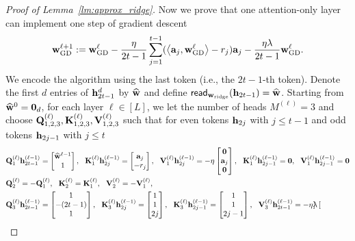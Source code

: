 \begin{proof}[Proof of Lemma~\ref{lm:approx_ridge}]
Now we prove that one  attention-only layer can implement one step of gradient descent
\begin{align*}
    {\mathbf w}^{{{\ell}}+1}_{{\mathrm{GD}}}:={\mathbf w}^{{{\ell}}}_{{\mathrm{GD}}}- \frac{\eta}{2t-1}\sum_{j=1}^{t-1}(\left\langle{\mathbf a}_j,{\mathbf w}^{{\ell}}_{{\mathrm{GD}}}\right\rangle-r_j){\mathbf a}_j- \frac{\eta\lambda}{2t-1}{\mathbf w}^{{\ell}}_{{\mathrm{GD}}}.
\end{align*}
We encode the algorithm using the last token (i.e., the $2t-1$-th token).
Denote the first $d$ entries of ${\mathbf h}_{2t-1}^{{d}}$ by $\widehat{{\mathbf w}}$ and  define ${\sf read}_{{\mathbf w}_{{\rm ridge}}}({\mathbf h}_{2t-1})=\widehat{{\mathbf w}}$. Starting from $\widehat{{\mathbf w}}^{0}={\mathbf 0}_d$, for each layer $\ell\in[L]$, we let the number of heads $M^{(\ell)}=3$ and  choose ${\mathbf Q}_{1,2,3}^{(\ell)},{\mathbf K}_{1,2,3}^{(\ell)},{\mathbf V}_{1,2,3}^{(\ell)}$ such that for even tokens ${\mathbf h}_{2j}$ with $j\leq t-1$ and odd tokens ${\mathbf h}_{2j-1}$ with $j\leq t$
\begin{align*}
    &{\mathbf Q}_1^{(\ell)}{\mathbf h}^{(\ell-1)}_{2t-1}=\begin{bmatrix}
        \widehat{{\mathbf w}}^{\ell-1}\\ 1
    \end{bmatrix},~~ {\mathbf K}_1^{(\ell)}{\mathbf h}^{(\ell-1)}_{2j}=\begin{bmatrix}
        {\mathbf a}_j\\ -r_j
    \end{bmatrix},~~ {\mathbf V}_1^{(\ell)}{\mathbf h}^{(\ell-1)}_{2j}=-\eta\begin{bmatrix}
        {\mathbf 0}\\ {\mathbf a}_j \\ {\mathbf 0}
    \end{bmatrix},~~
    {\mathbf K}_1^{(\ell)}{\mathbf h}^{(\ell-1)}_{2j-1}={\mathbf 0}, ~~{\mathbf V}_1^{(\ell)}{\mathbf h}^{(\ell-1)}_{2j-1}={\mathbf 0}
    \\
    &
    {\mathbf Q}_2^{(\ell)}=-{\mathbf Q}_1^{(\ell)},~~ {\mathbf K}_2^{(\ell)}={\mathbf K}_1^{(\ell)},~~  {\mathbf V}_2^{(\ell)}=-{\mathbf V}_1^{(\ell)},\\
     &
     {\mathbf Q}_3^{(\ell)}{\mathbf h}^{(\ell-1)}_{2t-1}=\begin{bmatrix}
         1\\-(2t-1)\\ 1
    \end{bmatrix},~~ {\mathbf K}_3^{(\ell)}{\mathbf h}^{(\ell-1)}_{2j}=\begin{bmatrix}
        1\\ 1 \\2j
    \end{bmatrix},~~ {\mathbf K}_3^{(\ell)}{\mathbf h}^{(\ell-1)}_{2j-1}=\begin{bmatrix}
        1\\ 1 \\2j-1
    \end{bmatrix},~~ {\mathbf V}_3^{(\ell)}{\mathbf h}^{(\ell-1)}_{2t-1}=-\eta\lambda\begin{bmatrix}

\end{bmatrix}
\end{align*}
\end{proof}
